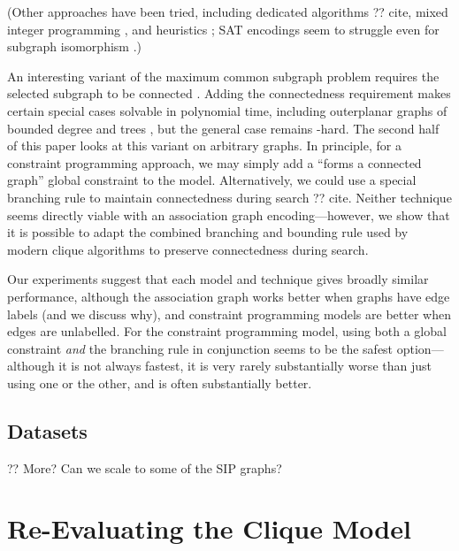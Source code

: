 \documentclass{llncs}
\begin{document}
(Other approaches have been tried, including dedicated algorithms ?? cite, mixed integer programming
\cite{DBLP:journals/anor/PivaS12}, and heuristics \cite{DBLP:journals/jcisd/EnglertK15}; SAT
encodings seem to struggle even for subgraph isomorphism \cite{UpcomingIJCAIPaper}.)

An interesting variant of the maximum common subgraph problem requires the selected subgraph to be
connected
\cite{DBLP:journals/tcs/Koch01,DBLP:journals/jcamd/RaymondW02a,DBLP:conf/mco/VismaraV08,Ehrlich:2011}.
Adding the connectedness requirement makes certain special cases solvable in polynomial time,
including outerplanar graphs of bounded degree \cite{DBLP:journals/algorithms/AkutsuT13} and trees
\cite{DBLP:journals/corr/DroschinskyKM16}, but the general case remains \NP-hard. The second half of
this paper looks at this variant on arbitrary graphs. In principle, for a constraint programming
approach, we may simply add a ``forms a connected graph'' global constraint
\cite{Brown:2005,DBLP:conf/cp/DoomsDD05,DBLP:conf/cp/QuesadaRD05} to the model. Alternatively, we
could use a special branching rule to maintain connectedness during search ?? cite. Neither
technique seems directly viable with an association graph encoding---however, we show that it is
possible to adapt the combined branching and bounding rule used by modern clique algorithms to
preserve connectedness during search.

Our experiments suggest that each model and technique gives broadly similar performance, although
the association graph works better when graphs have edge labels (and we discuss why), and constraint
programming models are better when edges are unlabelled. For the constraint programming model, using
both a global constraint \emph{and} the branching rule in conjunction seems to be the safest
option---although it is not always fastest, it is very rarely substantially worse than just using
one or the other, and is often substantially better.

\subsection{Datasets}

\cite{DBLP:journals/prl/SantoFSV03,DBLP:journals/jgaa/ConteFV07}

?? More? Can we scale to some of the SIP graphs?

\section{Re-Evaluating the Clique Model}
\end{document}
